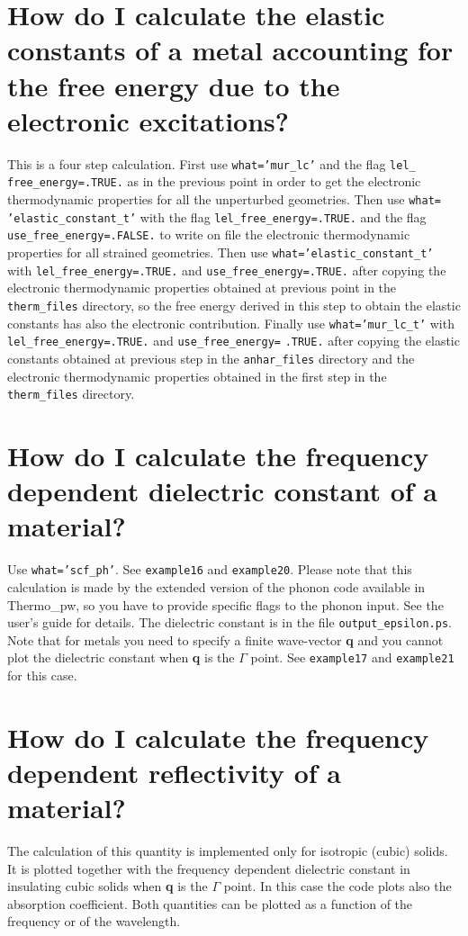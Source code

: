 \documentclass[12pt,a4paper,twoside]{report}
\def\thermo{{\sc Thermo}\_{\sc pw}}
\begin{document}
\newpage
{\color{coral}\section{How do I calculate the elastic constants of a metal
accounting for the free energy due to the electronic excitations?}}
\color{black}
This is a four step calculation. First use \texttt{what='mur\_lc'} and
the flag \texttt{lel\_} \texttt{free\_energy=.TRUE.} as in the previous point
in order to get the electronic thermodynamic properties for all the 
unperturbed geometries. Then use \texttt{what=} \texttt{'elastic\_constant\_t'}
with the flag \texttt{lel\_free\_energy=.TRUE.} and the flag
\texttt{use\_free\_energy=.FALSE.} to write on file the electronic
thermodynamic properties for all strained geometries. Then use
\texttt{what='elastic\_constant\_t'} with \texttt{lel\_free\_energy=.TRUE.}
and \texttt{use\_free\_energy=.TRUE.} after copying the electronic
thermodynamic properties obtained at previous point in the 
\texttt{therm\_files} directory, so the 
free energy derived in this step to obtain the elastic constants 
has also the electronic contribution. 
Finally use \texttt{what='mur\_lc\_t'} with \texttt{lel\_free\_energy=.TRUE.}
and \texttt{use\_free\_energy=} \texttt{.TRUE.} after copying the elastic
constants obtained at previous step in the \texttt{anhar\_files} directory
and the electronic thermodynamic properties obtained in the first 
step in the \texttt{therm\_files} directory.

\newpage
{\color{coral}\section{How do I calculate the frequency dependent dielectric
constant of a material?}}
\color{black}
Use \texttt{what='scf\_ph'}. See \texttt{example16} and \texttt{example20}. 
Please note that this calculation is made by the extended version of the
phonon code available in \thermo, so you have to provide specific flags
to the phonon input. See the user's guide for details. 
The dielectric constant is in the file \texttt{output\_epsilon.ps}.
Note that for metals you need to specify a finite wave-vector {\bf q} and you 
cannot plot the dielectric constant when {\bf q} is the $\Gamma$ point.  
See \texttt{example17} and \texttt{example21} for this case. 

\newpage
{\color{coral}\section{How do I calculate the frequency dependent 
reflectivity of a material?}}
\color{black}
The calculation of this quantity is implemented only for isotropic 
(cubic) solids. It is plotted together with the frequency dependent 
dielectric constant in insulating cubic solids when {\bf q} is 
the $\Gamma$ point. In this case the code plots also the 
absorption coefficient. Both quantities can be plotted as a function of
the frequency or of the wavelength.
\end{document}
